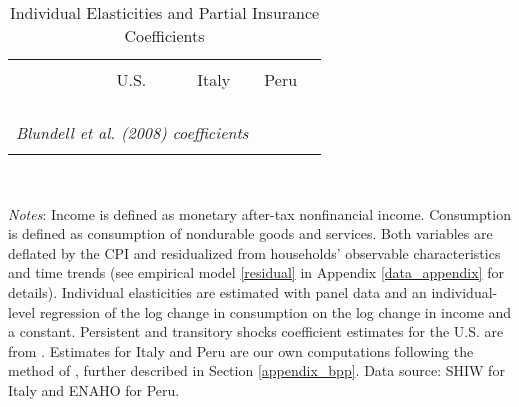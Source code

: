 \documentclass[12pt]{article}
\begin{document}
\begin{spacing}{1.5}
\begin{figure}[H]
\end{figure}


\begin{table}[H]
	\begin{centering}
		\captionsetup{justification=centering}
		\caption{Individual Elasticities and Partial Insurance Coefficients} \label{tab:BPP_estimates}
		\vspace*{-0.2em}
		\begin{tabular}{lllcccc}
			\toprule
			\vspace{-.5em}      \\
			& & \hspace{2em} & \multicolumn{1}{c}{{U.S.}} &   \multicolumn{1}{c}{ {Italy}}
			& \multicolumn{1}{c}{ {Peru}}  \\
			\vspace{-.5em}      \\
			\hline
			\vspace{-.5em}      \\
			 
			\vspace{-.5em}  \\
			\hline
			\vspace{-.5em}      \\
			\multicolumn{5}{l}{\textit{Blundell \textit{et al.} (2008) coefficients}} \vspace{.5em}  \\
			 
			\vspace{-.5em}  \\
			\toprule
		\end{tabular} \\ \vspace*{0.5em}
	\end{centering}
	\flushleft  \footnotesize{\textit{Notes}: Income is defined as monetary after-tax nonfinancial income. Consumption is defined as consumption of nondurable goods and services. Both variables are deflated by the CPI and residualized from households' observable characteristics and time trends (see empirical model \eqref{residual} in Appendix \ref{data_appendix} for details). Individual elasticities are estimated with panel data and an individual-level regression of the log change in consumption on the log change in income and a constant. Persistent and transitory shocks coefficient estimates for the U.S. are from \citet{blundell2008consumption}. Estimates for Italy and Peru are our own computations following the method of \citet{blundell2008consumption}, further described in Section \ref{appendix_bpp}. Data source: SHIW for Italy and ENAHO for Peru.}
\end{table}



\end{spacing}
\end{document}
